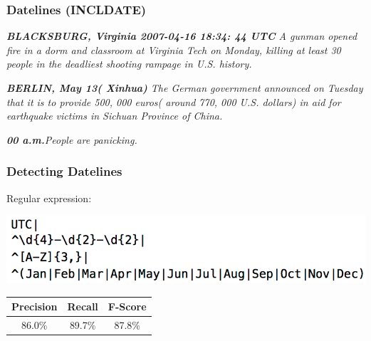 \documentclass[table]{beamer}
\begin{document}

\begin{frame}
  \frametitle{Datelines (INCLDATE)}
  \textit{\textbf{BLACKSBURG, Virginia 2007-04-16 18:34: 44 UTC} A gunman opened fire in a dorm and classroom at Virginia Tech on Monday, killing at least 30 people in the deadliest shooting rampage in U.S. history.}
  \vspace{0.5cm}

  \textit{\textbf{BERLIN, May 13( Xinhua)} The German government announced on Tuesday that it is to provide 500, 000 euros( around 770, 000 U.S. dollars) in aid for earthquake victims in Sichuan Province of China.}
  \vspace{0.5cm}

  \textit{\textbf{00 a.m.}People are panicking.}
\end{frame}

\begin{frame}
  \frametitle{Detecting Datelines}
  Regular expression:

  \includegraphics[scale=0.4]{regex.png}

  \vspace{1cm}\pause

  \begin{tabular}{|c|c|c|}
  \hline
  \textbf{Precision} & \textbf{Recall} & \textbf{F-Score}\\
  \hline
  86.0\% & 89.7\% & 87.8\%\\
  \hline
  \end{tabular}
\end{frame}
\end{document}
